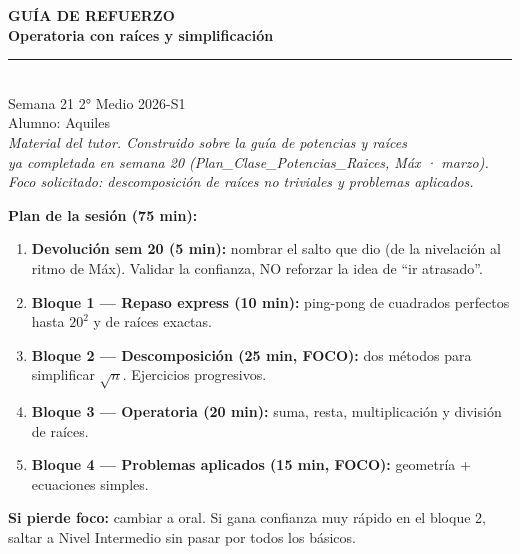 \documentclass[11pt,a4paper]{article}
\begin{document}
\thispagestyle{empty}
\vspace*{2.5cm}
\begin{center}
  {\Huge\bfseries\color{azulprincipal} GUÍA DE REFUERZO}\\[8pt]
  {\LARGE\bfseries\color{azuloscuro} Operatoria con raíces y simplificación}\\[15pt]
  {\color{azulprincipal}\rule{8cm}{2pt}}\\[15pt]
  {\Large Semana 21 \textbar{} 2° Medio \textbar{} 2026-S1}\\[8pt]
  {\large Alumno: Aquiles}\\[25pt]
  {\itshape\color{gray}
  Material del tutor. Construido sobre la guía de potencias y raíces\\[4pt]
  ya completada en semana 20 (Plan\_Clase\_Potencias\_Raices, Máx · marzo).\\[4pt]
  Foco solicitado: descomposición de raíces no triviales y problemas aplicados.}
\end{center}

\vspace{1cm}
\begin{tcolorbox}[recuerda]
\textbf{Plan de la sesión (75 min):}
\begin{enumerate}[nosep]
  \item \textbf{Devolución sem 20 (5 min):} nombrar el salto que dio (de la nivelación al ritmo de Máx). Validar la confianza, NO reforzar la idea de ``ir atrasado''.
  \item \textbf{Bloque 1 --- Repaso express (10 min):} ping-pong de cuadrados perfectos hasta $20^2$ y de raíces exactas.
  \item \textbf{Bloque 2 --- Descomposición (25 min, FOCO):} dos métodos para simplificar $\sqrt{n}$. Ejercicios progresivos.
  \item \textbf{Bloque 3 --- Operatoria (20 min):} suma, resta, multiplicación y división de raíces.
  \item \textbf{Bloque 4 --- Problemas aplicados (15 min, FOCO):} geometría + ecuaciones simples.
\end{enumerate}

\textbf{Si pierde foco:} cambiar a oral. Si gana confianza muy rápido en el bloque 2, saltar a Nivel Intermedio sin pasar por todos los básicos.
\end{tcolorbox}

\newpage

\end{document}
